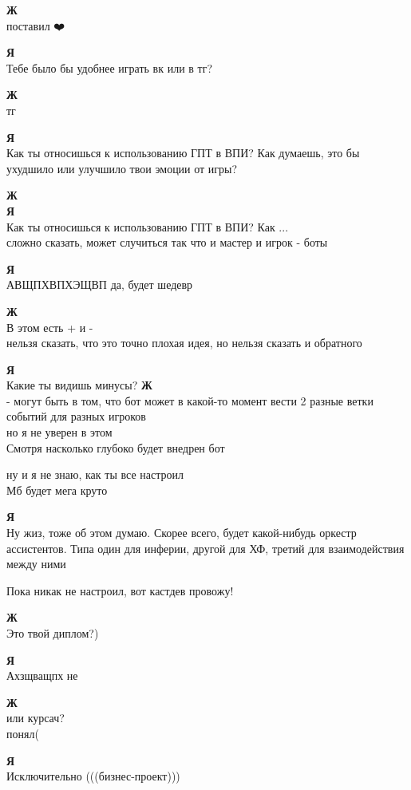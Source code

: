 \begin{tabbing}
\textbf{Ж} \\
поставил ❤️🎅

\textbf{Я} \\
Тебе было бы удобнее играть вк или в тг?

\textbf{Ж} \\
тг

\textbf{Я} \\
Как ты относишься к использованию ГПТ в ВПИ? Как думаешь, это бы ухудшило или улучшило твои эмоции от игры?

\textbf{Ж} \\
\textbf{Я} \\
Как ты относишься к использованию ГПТ в ВПИ? Как ... \\
сложно сказать, может случиться так что и мастер и игрок - боты

\textbf{Я} \\
АВЩПХВПХЭЩВП да, будет шедевр

\textbf{Ж} \\
В этом есть + и - \\
нельзя сказать, что это точно плохая идея, но нельзя сказать и обратного

\textbf{Я} \\
Какие ты видишь минусы?
\textbf{Ж} \\
- могут быть в том, что бот может в какой-то момент вести 2 разные ветки событий для разных игроков \\
но я не уверен в этом \\
Смотря насколько глубоко будет внедрен бот

ну и я не знаю, как ты все настроил \\
Мб будет мега круто

\textbf{Я} \\
Ну жиз, тоже об этом думаю. Скорее всего, будет какой-нибудь оркестр ассистентов. Типа один для инферии, другой для ХФ, третий для взаимодействия между ними

Пока никак не настроил, вот кастдев провожу!

\textbf{Ж} \\
Это твой диплом?)

\textbf{Я} \\
Ахзщващпх не

\textbf{Ж} \\
или курсач? \\
понял(

\textbf{Я} \\
Исключительно (((бизнес-проект)))


\end{tabbing}
